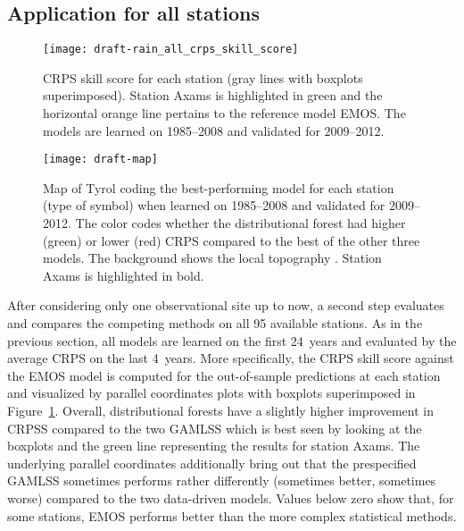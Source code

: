 \documentclass[aoas, preprint]{imsart}
\numberwithin{equation}{subsection}
\begin{document}

\subsection{Application for all stations}
\label{sec:all}




\begin{figure}[t!]
\centering
{}
\texttt{[image: draft-rain\_all\_crps\_skill\_score]}
\caption{\label{fig:all-crps}CRPS skill score for each station (gray lines
with boxplots superimposed). Station Axams is highlighted in green 
and the horizontal orange line pertains to the reference model EMOS. The models are 
learned on 1985--2008 and validated for 2009--2012.}
\end{figure}

\begin{figure}[t!]
\centering
{}
\texttt{[image: draft-map]}
\caption{\label{fig:all-map}Map of Tyrol coding the best-performing model
for each station (type of symbol) when learned on 1985--2008 and validated for 2009--2012.
The color codes whether the distributional 
forest had higher (green) or lower (red) CRPS compared to the best of the 
other three models. The background shows the local topography \citep{Robinson:2014}.
Station Axams is highlighted in bold.}
\end{figure}


After considering only one observational site up to now, a second step
evaluates and compares the competing methods on all 95 available stations. As in the previous
section, all models are learned on the first 24~years and evaluated by the
average CRPS on the last 4~years. More specifically, the CRPS skill score
against the EMOS model is computed for the out-of-sample predictions at each
station and visualized by parallel coordinates plots with boxplots superimposed
in Figure~\ref{fig:all-crps}. Overall, distributional forests have a slightly
higher improvement in CRPSS compared to the two GAMLSS which is best seen
by looking at the boxplots and the green line representing the results
for station Axams. The underlying parallel coordinates additionally
bring out that the prespecified GAMLSS sometimes performs rather differently
(sometimes better, sometimes worse) compared to the two data-driven models.
Values below zero show that, for some stations, EMOS performs better
than the more complex statistical methods.
\end{document}
